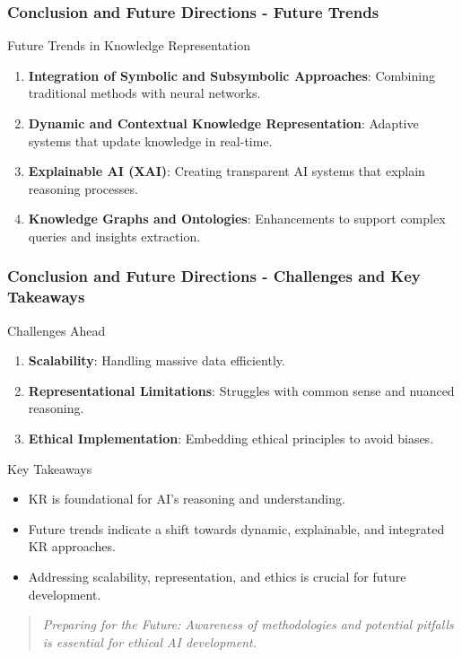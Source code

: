 \documentclass[aspectratio=169]{beamer}
\begin{document}
\begin{frame}[fragile]
  \frametitle{Conclusion and Future Directions - Future Trends}
  
  \begin{block}{Future Trends in Knowledge Representation}
    \begin{enumerate}
      \item \textbf{Integration of Symbolic and Subsymbolic Approaches}: Combining traditional methods with neural networks.
      \item \textbf{Dynamic and Contextual Knowledge Representation}: Adaptive systems that update knowledge in real-time.
      \item \textbf{Explainable AI (XAI)}: Creating transparent AI systems that explain reasoning processes.
      \item \textbf{Knowledge Graphs and Ontologies}: Enhancements to support complex queries and insights extraction.
    \end{enumerate}
  \end{block}
\end{frame}

\begin{frame}[fragile]
  \frametitle{Conclusion and Future Directions - Challenges and Key Takeaways}
  
  \begin{block}{Challenges Ahead}
    \begin{enumerate}
      \item \textbf{Scalability}: Handling massive data efficiently.
      \item \textbf{Representational Limitations}: Struggles with common sense and nuanced reasoning.
      \item \textbf{Ethical Implementation}: Embedding ethical principles to avoid biases.
    \end{enumerate}
  \end{block}
  
  \begin{block}{Key Takeaways}
    \begin{itemize}
      \item KR is foundational for AI's reasoning and understanding.
      \item Future trends indicate a shift towards dynamic, explainable, and integrated KR approaches.
      \item Addressing scalability, representation, and ethics is crucial for future development.
    \end{itemize}
  \end{block}
  
  \begin{quote}
    \textit{Preparing for the Future: Awareness of methodologies and potential pitfalls is essential for ethical AI development.}
  \end{quote}
\end{frame}
\end{document}
